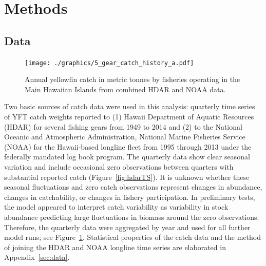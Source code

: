 \documentclass[12pt,letterpaper,twoside]{article}
\begin{document}
\section{Methods}
\subsection{Data}
\begin{figure}
\begin{center}
\texttt{[image: ./graphics/5\_gear\_catch\_history\_a.pdf]}
\caption{\label{fig:annualTS}
Annual yellowfin catch in metric tonnes by fisheries
operating in the Main Hawaiian Islands from combined HDAR and NOAA data.
}
\end{center}
\end{figure}

Two basic sources of catch data were used in this analysis:
quarterly time series of YFT catch weights reported to (1)
Hawaii Department of Aquatic Resources (HDAR) for several fishing
gears from 1949 to 2014 and (2)
to the National Oceanic and Atmospheric Administration, National
Marine Fisheries Service (NOAA) for the Hawaii-based longline fleet
from 1995 through 2013 under the federally mandated log book program.
The quarterly data show clear seasonal variation and include
occasional zero observations between quarters with substantial
reported catch (Figure~\ref{fig:hdarTS}).
It is unknown whether these seasonal fluctuations and zero
catch observations represent changes in abundance, changes in
catchability, or changes in
fishery participation. In preliminary tests, the model appeared to
interpret catch variability as variability in stock abundance
predicting large fluctuations in biomass around the zero observations. Therefore,
the quarterly data were aggregated by year and used for all further
model runs; see Figure~\ref{fig:annualTS}.
Statistical properties of the catch data and the method of joining the
HDAR and NOAA longline time series are elaborated in
Appendix~\ref{sec:data}. 
\end{document}
